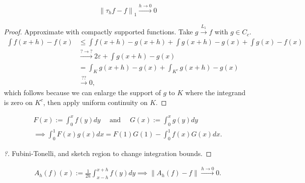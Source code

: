 \begin{theorem}[Continuity in $L^1$]

\begin{align*} 
{\left\lVert {\tau_h f - f} \right\rVert}_1 \overset{h\to 0}\to 0
\end{align*}

\end{theorem}

\begin{proof}

\envlist

Approximate with compactly supported functions. Take
\(g\overset{L_1}\to f\) with \(g\in C_c\).
\begin{align*}
\int f(x+h) - f(x) 
&\leq \int f(x+h) - g(x+h) + \int g(x+h) - g(x) + \int g(x) - f(x) \\
&\overset{?\to?}\to 2 \varepsilon + \int g(x+h) - g(x) \\
&= \int_K g(x+h) - g(x) + \int_{K^c} g(x+h) - g(x)\\
&\overset{??}\to 0
,\end{align*}
which follows because we can enlarge the support of \(g\) to \(K\) where
the integrand is zero on \(K^c\), then apply uniform continuity on
\(K\).

\end{proof}

\begin{proposition}

\begin{align*}
F(x):=\int_{0}^{x} f(y) d y \quad \text { and } \quad G(x):=\int_{0}^{x} g(y) d y \\ 
\implies
\int_{0}^{1} F(x) g(x) d x=F(1) G(1)-\int_{0}^{1} f(x) G(x) d x
.\end{align*}

\end{proposition}

\begin{proof}[?]

Fubini-Tonelli, and sketch region to change integration bounds.

\end{proof}

\begin{theorem}

\begin{align*}
A_{h}(f)(x):=\frac{1}{2 h} \int_{x-h}^{x+h} f(y) d y
\implies {\left\lVert {A_h(f) - f} \right\rVert} \overset{h\to 0}\to 0
.\end{align*}

\end{theorem}

